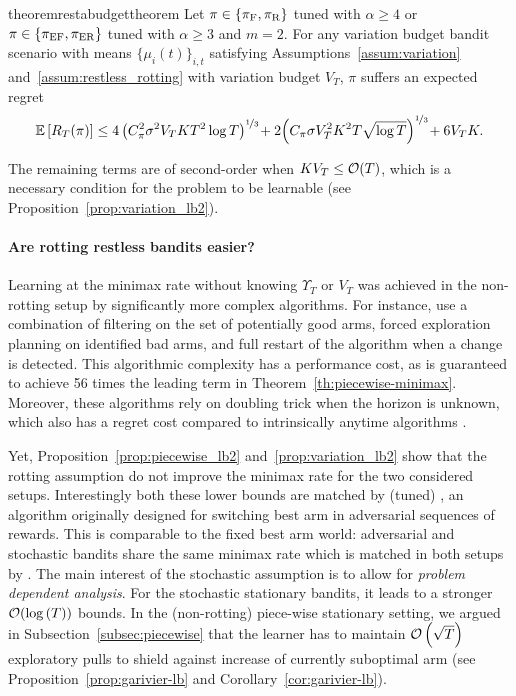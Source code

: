 \vspace{-2em}
\begin{restatable}{theorem}{restabudgettheorem}
\label{th:variation-minimax}
Let $\pi \in \left\{ \pi_{\rm F}, \pi_{\rm R}\right\}$ tuned with $\alpha \geq 4$ or $\pi \in \left\{ \normalfont \pi_{\rm EF}, \normalfont \pi_{\rm ER}\right\}$ tuned with $\alpha \geq 3$ and $m=2$. For any variation budget bandit scenario with means $\{\mu_i(t)\}_{i,t}$ satisfying Assumptions~\ref{assum:variation} and~\ref{assum:restless_rotting}  with variation budget $V_T$, $\pi$ suffers an expected regret\,
\[
\mathbb{E}\left[R_T(\pi)\right] \leq 4\left(C_\pi^2 \sigma^2 V_T K T^2\log{T}\right)^{\nicefrac{1}{3}} \!+ 2\Big(C_\pi \sigma V_T^2  K^2  T \sqrt{\log{T}}\Big)^{\nicefrac{1}{3}} \!+ 6 V_T K.
\]
\end{restatable}
%
The remaining terms are of second-order when $KV_T \leq \mathcal{O}{\left(T\right)}$, which is a necessary condition for the problem to be learnable (see Proposition~\ref{prop:variation_lb2}). 
%
\paragraph{Are rotting restless bandits easier?} Learning at the minimax rate without knowing $\Upsilon_T$ or $V_T$ was achieved in the non-rotting setup by significantly more complex algorithms. For instance, \citet{auer2019adaptively} use a combination of filtering on the set of potentially good arms, forced exploration planning on identified bad arms, and full restart of the algorithm when a change is detected. This algorithmic complexity has a performance cost, as \ADSWITCH is guaranteed to achieve 56 times the leading term in Theorem~\ref{th:piecewise-minimax}. Moreover, these algorithms rely on doubling trick when the horizon is unknown, which also has a regret cost compared to intrinsically anytime algorithms \citep{besson2018doubling}.

Yet, Proposition~\ref{prop:piecewise_lb2}  and~\ref{prop:variation_lb2} show that the rotting assumption do not improve the minimax rate for the two considered setups. Interestingly both these lower bounds are matched by (tuned) \EXPS \citep{auer2002nonstochastic}, an algorithm originally designed for switching best arm in adversarial sequences of rewards. This is comparable to the fixed best arm world:  adversarial and stochastic bandits share the same minimax rate which is matched in both setups by \EXP. The main interest of the stochastic assumption is to allow for \textit{problem dependent analysis}. For the stochastic stationary bandits, it leads to a stronger $\mathcal{O}{\left(\log\left(T\right)\right)}$ bounds. In the (non-rotting) piece-wise stationary setting, we argued in Subsection~\ref{subsec:piecewise} that the learner has to maintain $\mathcal{O}\left(\sqrt{T}\right)$ exploratory pulls to shield against increase of currently suboptimal arm (see Proposition~\ref{prop:garivier-lb} and Corollary~\ref{cor:garivier-lb}).

